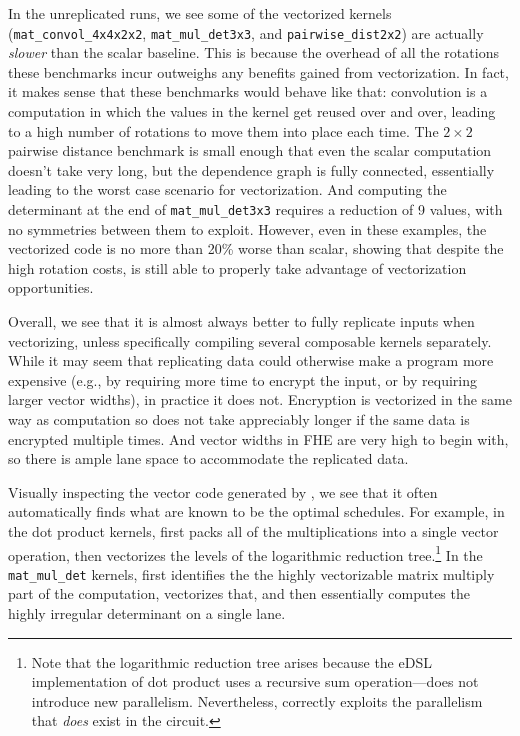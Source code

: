 In the unreplicated runs, we see some of the vectorized kernels (\texttt{mat\-\_convol\-\_4x4x2x2}, \texttt{mat\-\_mul\-\_det3x3}, and \texttt{pair\-wise\-\_dist2x2}) are actually {\em slower} than the scalar baseline.
This is because the overhead of all the rotations these benchmarks incur outweighs any benefits gained from vectorization.
In fact, it makes sense that these benchmarks would behave like that: convolution is a computation in which the values in the kernel get reused over and over, leading to a high number of rotations to move them into place each time.
The $2\times 2$ pairwise distance benchmark is small enough that even the scalar computation doesn't take very long, but the dependence graph is fully connected, essentially leading to the worst case scenario for vectorization.
And computing the determinant at the end of \texttt{mat\_mul\_det3x3} requires a reduction of 9 values, with no symmetries between them to exploit.
However, even in these examples, the vectorized code is no more than 20\% worse than scalar, showing that despite the high rotation costs, \system is still able to properly take advantage of vectorization opportunities.

Overall, we see that it is almost always better to fully replicate inputs when vectorizing, unless specifically compiling several composable kernels separately. While it may seem that replicating data could otherwise make a program more expensive (e.g., by requiring more time to encrypt the input, or by requiring larger vector widths), in practice it does not. Encryption is vectorized in the same way as computation so does not take appreciably longer if the same data is encrypted multiple times. And vector widths in FHE are very high to begin with, so there is ample lane space to accommodate the replicated data.

Visually inspecting the vector code generated by \system, we see that it often automatically finds what are known to be the optimal schedules.
For example, in the dot product kernels, \system first packs all of the multiplications into a single vector operation, then vectorizes the levels of the logarithmic reduction tree.\footnote{Note that the logarithmic reduction tree arises because the eDSL implementation of dot product uses a recursive sum operation---\system does not introduce new parallelism. Nevertheless, \system correctly exploits the parallelism that {\em does} exist in the circuit.}
In the \texttt{mat\_mul\_det} kernels, \system first identifies the the highly vectorizable matrix multiply part of the computation, vectorizes that, and then essentially computes the highly irregular determinant on a single lane.

